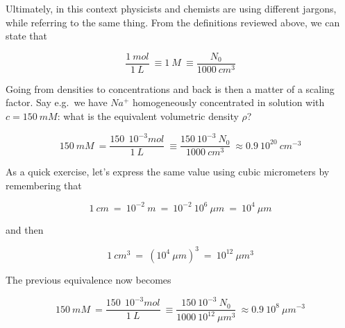 Ultimately, in this context physicists and chemists are using different jargons, while referring to the same thing. From the definitions reviewed above, we can state that

\[
 \frac{1\ mol}{1\ L}\ \equiv 1\ M\ \equiv \frac{N_0}{1000\ cm^3} 
\]

Going from densities to concentrations and back is then a matter of a scaling factor. Say e.g.\ we have \( Na^+ \) homogeneously concentrated in solution with \( c=150\ mM \): what is the equivalent volumetric density \( \rho \)?

\[
 150\ mM\ = \frac{150\ \ 10^{-3} mol}{1\ L}\ \equiv \frac{150\ 10^{ -3}\ N_0}{1000\ cm^3}\ \approx 0.9\ 10^{20}\ cm^{ - 3}
\]

As a quick exercise, let's express the same value using cubic micrometers by remembering that 

\[
 1\ cm\ =\ 10^{ -2}\ m\ =\ 10^{ -2}\ 10^{6}\ \mu m\ =\ 10^{4}\ \mu m 
\]

and then

\[
 1\ cm^{3}\ =\ (10^{4}\ \mu m)^3\ =\ 10^{12}\ \mu m^{3} 
\]

The previous equivalence now becomes

\[
 150\ mM\ = \frac{150\ \ 10^{-3} mol}{1\ L}\ \equiv \frac{150\ 10^{ -3}\ N_0}{1000\ 10^{12}\ \mu m^3}\ \approx 0.9\ 10^{8}\ \mu m^{ - 3}
\]

